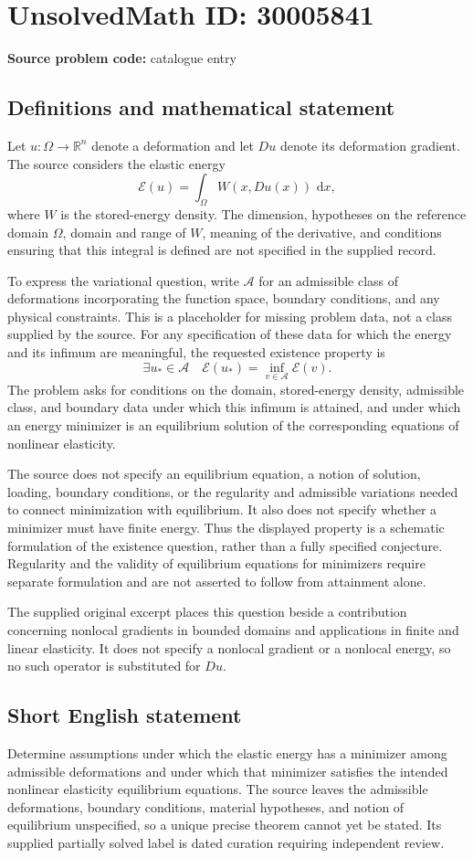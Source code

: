 \documentclass[11pt]{article}
\newcommand{\R}{\mathbb{R}}
\newcommand{\dd}{\,\mathrm{d}}
\begin{document}
\section*{UnsolvedMath ID: 30005841}
\textbf{Source problem code:} catalogue entry
\subsection{Definitions and mathematical statement}
Let \(u:\Omega\to\R^n\) denote a deformation and let \(Du\) denote its deformation gradient. The source considers the elastic energy
\[
\mathcal E(u)=\int_\Omega W(x,Du(x))\,\dd x,
\]
where \(W\) is the stored-energy density. The dimension, hypotheses on the reference domain \(\Omega\), domain and range of \(W\), meaning of the derivative, and conditions ensuring that this integral is defined are not specified in the supplied record.

To express the variational question, write \(\mathcal A\) for an admissible class of deformations incorporating the function space, boundary conditions, and any physical constraints. This is a placeholder for missing problem data, not a class supplied by the source. For any specification of these data for which the energy and its infimum are meaningful, the requested existence property is
\[
\exists u_*\in\mathcal A\quad
\mathcal E(u_*)=\inf_{v\in\mathcal A}\mathcal E(v).
\]
The problem asks for conditions on the domain, stored-energy density, admissible class, and boundary data under which this infimum is attained, and under which an energy minimizer is an equilibrium solution of the corresponding equations of nonlinear elasticity.

The source does not specify an equilibrium equation, a notion of solution, loading, boundary conditions, or the regularity and admissible variations needed to connect minimization with equilibrium. It also does not specify whether a minimizer must have finite energy. Thus the displayed property is a schematic formulation of the existence question, rather than a fully specified conjecture. Regularity and the validity of equilibrium equations for minimizers require separate formulation and are not asserted to follow from attainment alone.

The supplied original excerpt places this question beside a contribution concerning nonlocal gradients in bounded domains and applications in finite and linear elasticity. It does not specify a nonlocal gradient or a nonlocal energy, so no such operator is substituted for \(Du\).
\subsection{Short English statement}
Determine assumptions under which the elastic energy has a minimizer among admissible deformations and under which that minimizer satisfies the intended nonlinear elasticity equilibrium equations. The source leaves the admissible deformations, boundary conditions, material hypotheses, and notion of equilibrium unspecified, so a unique precise theorem cannot yet be stated. Its supplied partially solved label is dated curation requiring independent review.
\end{document}
